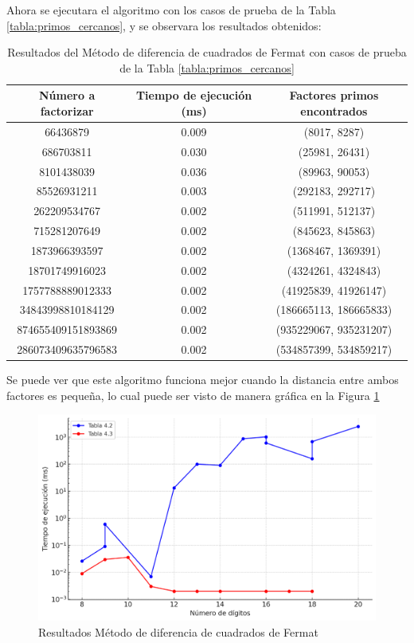     Ahora se ejecutara el algoritmo con los casos de prueba de la Tabla \ref{tabla:primos_cercanos}, y se observara los resultados obtenidos:

    \begin{table}[H]
        \centering
        \begin{tabular}{ccc}
        \toprule
        Número a factorizar & Tiempo de ejecución (ms) & Factores primos encontrados\\
        \midrule
        66436879 & 0.009 & (8017, 8287)\\
        686703811 & 0.030 & (25981, 26431)\\
        8101438039 & 0.036 & (89963, 90053)\\
        85526931211 & 0.003 & (292183, 292717)\\
        262209534767 & 0.002 & (511991, 512137)\\
        715281207649 & 0.002 & (845623, 845863)\\
        1873966393597 & 0.002 & (1368467, 1369391)\\
        18701749916023 & 0.002 & (4324261, 4324843)\\
        1757788889012333 & 0.002 & (41925839, 41926147)\\
        34843998810184129 & 0.002 & (186665113, 186665833)\\
        874655409151893869 & 0.002 & (935229067, 935231207)\\
        286073409635796583 & 0.002 & (534857399, 534859217)\\
        \bottomrule
        \end{tabular}
        \caption{Resultados del Método de diferencia de cuadrados de Fermat con casos de prueba de la Tabla \ref{tabla:primos_cercanos}}
        \label{tab:res-fermat-cercano}
    \end{table}

    Se puede ver que este algoritmo funciona mejor cuando la distancia entre ambos factores es pequeña, lo cual puede ser visto de manera gráfica en la Figura \ref{fig:res-fermat}

    \begin{figure}[H]
        \centering
        \includegraphics[width=\linewidth]{images/fermat_result.png}
        \caption{Resultados Método de diferencia de cuadrados de Fermat}
        \label{fig:res-fermat}
    \end{figure}

